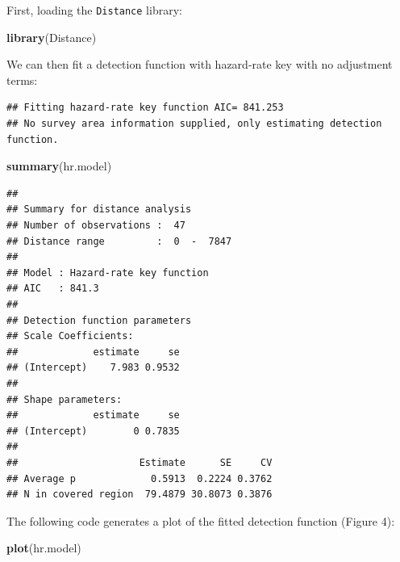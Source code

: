 \documentclass[]{amsart}
\newenvironment{Shaded}{}{}
\newcommand{\KeywordTok}[1]{\textcolor[rgb]{0.00,0.44,0.13}{\textbf{{#1}}}}
\newcommand{\DataTypeTok}[1]{\textcolor[rgb]{0.56,0.13,0.00}{{#1}}}
\newcommand{\StringTok}[1]{\textcolor[rgb]{0.25,0.44,0.63}{{#1}}}
\newcommand{\OtherTok}[1]{\textcolor[rgb]{0.00,0.44,0.13}{{#1}}}
\newcommand{\NormalTok}[1]{{#1}}
\begin{document}
First, loading the \texttt{Distance} library:

\begin{Shaded}
\begin{Highlighting}[]
\KeywordTok{library}\NormalTok{(Distance)}
\end{Highlighting}
\end{Shaded}

We can then fit a detection function with hazard-rate key with no
adjustment terms:

\begin{Shaded}
\end{Shaded}

\begin{verbatim}
## Fitting hazard-rate key function AIC= 841.253
## No survey area information supplied, only estimating detection function.
\end{verbatim}

\begin{Shaded}
\begin{Highlighting}[]
\KeywordTok{summary}\NormalTok{(hr.model)}
\end{Highlighting}
\end{Shaded}

\begin{verbatim}
## 
## Summary for distance analysis 
## Number of observations :  47 
## Distance range         :  0  -  7847 
## 
## Model : Hazard-rate key function 
## AIC   : 841.3 
## 
## Detection function parameters
## Scale Coefficients:  
##             estimate     se
## (Intercept)    7.983 0.9532
## 
## Shape parameters:  
##             estimate     se
## (Intercept)        0 0.7835
## 
##                     Estimate      SE     CV
## Average p             0.5913  0.2224 0.3762
## N in covered region  79.4879 30.8073 0.3876
\end{verbatim}

The following code generates a plot of the fitted detection function
(Figure 4):

\begin{Shaded}
\begin{Highlighting}[]
\KeywordTok{plot}\NormalTok{(hr.model)}
\end{Highlighting}
\end{Shaded}
\end{document}
